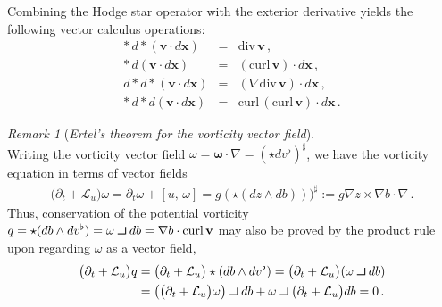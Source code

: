 \documentclass[11pt, oneside]{article}   	%
\def\contract{\makebox[1.2em][c]{\mbox{\rule{.6em}
{.01truein}\rule{.01truein}{.6em}}}}
\numberwithin{equation}{section}
\theoremstyle{plain}
\theoremstyle{definition}
\theoremstyle{remark}
\newtheorem{remark}[theorem]{Remark}
\newcommand{\<}{\langle}
\renewcommand{\>}{\rangle}
\begin{document}
Combining the Hodge star operator with the exterior derivative yields the following vector calculus operations:
\begin{eqnarray*}
*\,d*(\mathbf{v}\cdot d\mathbf{x}) &=& \mathrm{div}\,\mathbf{v}
\,,\\
*\,d(\mathbf{v}\cdot d\mathbf{x}) &=& (\mathrm{curl}\,\mathbf{v})\cdot d\mathbf{x}
\,,\\
d*d*(\mathbf{v}\cdot d\mathbf{x}) &=& (\nabla\mathrm{div}\,\mathbf{v})\cdot d\mathbf{x}
\,,\\
*\,d*d(\mathbf{v}\cdot d\mathbf{x}) &=&
\mathrm{curl}\,(\mathrm{curl}\,\mathbf{v})\cdot d\mathbf{x}
\,.
\end{eqnarray*}%

%

\begin{remark}[\emph{Ertel's theorem for the vorticity vector field}]$\,$\\ \textrm
Writing the vorticity vector field $\omega=\boldsymbol{\omega}\cdot\nabla = ( \star dv^\flat)^\sharp$, we have the 
vorticity equation in terms of vector fields
 \begin{align*}
\big(\partial_t +  \mathcal{L}_u\big)\omega 
=
\partial_t\omega + [u,\,\omega]  = g(\star( dz\wedge db)) )^\sharp := g\nabla{z}\times\nabla{b}\cdot\nabla
\,. \end{align*}
Thus, conservation of the potential vorticity $q= \star(db \wedge dv^\flat) = \omega \contract db  =  \nabla b\cdot \mathrm{curl}\,\mathbf{v} $ 
may also be proved by the product rule upon regarding $\omega$ as  a vector field,
 \begin{align*}
 \big(\partial_t +  \mathcal{L}_u\big)q
 &=
 \big(\partial_t +  \mathcal{L}_u\big)\star(db \wedge dv^\flat)
 = 
\big(\partial_t +  \mathcal{L}_u\big)(\omega \contract db )
\\&=
\big(\big(\partial_t +  \mathcal{L}_u\big)\omega\big) \contract db 
+ \omega\contract  \big(\partial_t +  \mathcal{L}_u\big) db = 0
\,. \end{align*}
 \end{remark}
 
\end{document}

